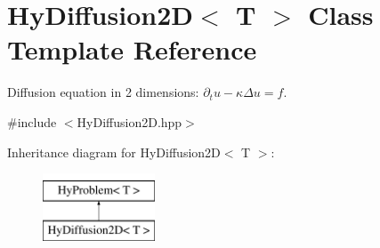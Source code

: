 \hypertarget{classHyDiffusion2D}{
\section{HyDiffusion2D$<$ T $>$ Class Template Reference}
\label{classHyDiffusion2D}
}


Diffusion equation in 2 dimensions: $ \partial_t u - \kappa\Delta u = f $.  




{\ttfamily \#include $<$HyDiffusion2D.hpp$>$}

Inheritance diagram for HyDiffusion2D$<$ T $>$:\begin{figure}[H]
\begin{center}
\leavevmode
\includegraphics[height=2cm]{classHyDiffusion2D}
\end{center}
\end{figure}
